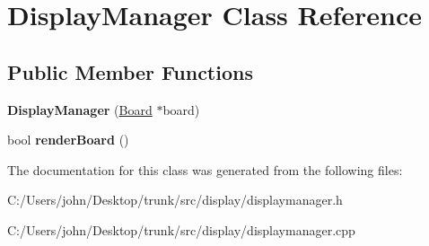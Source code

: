 \hypertarget{class_display_manager}{}\section{Display\+Manager Class Reference}
\label{class_display_manager}
\subsection*{Public Member Functions}
\begin{DoxyCompactItemize}
\item 
{\bfseries Display\+Manager} (\hyperlink{class_board}{Board} $\ast$board)\hypertarget{class_display_manager_a6acb73dfa0fff0bd72eacbd06a1b32ca}{}\label{class_display_manager_a6acb73dfa0fff0bd72eacbd06a1b32ca}

\item 
bool {\bfseries render\+Board} ()\hypertarget{class_display_manager_a8d05082a8fdbd4a0cdee36650290c02b}{}\label{class_display_manager_a8d05082a8fdbd4a0cdee36650290c02b}

\end{DoxyCompactItemize}


The documentation for this class was generated from the following files\+:\begin{DoxyCompactItemize}
\item 
C\+:/\+Users/john/\+Desktop/trunk/src/display/displaymanager.\+h\item 
C\+:/\+Users/john/\+Desktop/trunk/src/display/displaymanager.\+cpp\end{DoxyCompactItemize}
